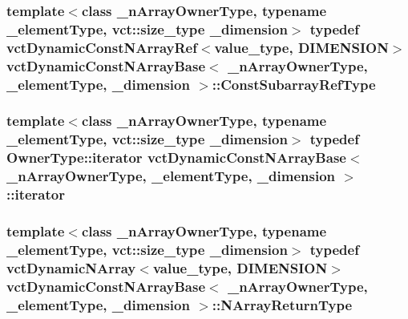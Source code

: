 \hypertarget{classvct_dynamic_const_n_array_base_a4b3508630e409eda4f0d2f55d17d89a4}{
\subsubsection[{Const\-Subarray\-Ref\-Type}]{\setlength{\rightskip}{0pt plus 5cm}template$<$class \-\_\-n\-Array\-Owner\-Type, typename \-\_\-element\-Type, vct\-::size\-\_\-type \-\_\-dimension$>$ typedef {\bf vct\-Dynamic\-Const\-N\-Array\-Ref}$<$value\-\_\-type, {\bf D\-I\-M\-E\-N\-S\-I\-O\-N}$>$ {\bf vct\-Dynamic\-Const\-N\-Array\-Base}$<$ \-\_\-n\-Array\-Owner\-Type, \-\_\-element\-Type, \-\_\-dimension $>$\-::{\bf Const\-Subarray\-Ref\-Type}}}\label{classvct_dynamic_const_n_array_base_a4b3508630e409eda4f0d2f55d17d89a4}
\hypertarget{classvct_dynamic_const_n_array_base_a0d7eee16dd05c2f5757640b3617cac5d}{
\subsubsection[{iterator}]{\setlength{\rightskip}{0pt plus 5cm}template$<$class \-\_\-n\-Array\-Owner\-Type, typename \-\_\-element\-Type, vct\-::size\-\_\-type \-\_\-dimension$>$ typedef Owner\-Type\-::iterator {\bf vct\-Dynamic\-Const\-N\-Array\-Base}$<$ \-\_\-n\-Array\-Owner\-Type, \-\_\-element\-Type, \-\_\-dimension $>$\-::{\bf iterator}}}\label{classvct_dynamic_const_n_array_base_a0d7eee16dd05c2f5757640b3617cac5d}
\hypertarget{classvct_dynamic_const_n_array_base_a7507402a90022d7a14ad7038fac07041}{
\subsubsection[{N\-Array\-Return\-Type}]{\setlength{\rightskip}{0pt plus 5cm}template$<$class \-\_\-n\-Array\-Owner\-Type, typename \-\_\-element\-Type, vct\-::size\-\_\-type \-\_\-dimension$>$ typedef {\bf vct\-Dynamic\-N\-Array}$<$value\-\_\-type, {\bf D\-I\-M\-E\-N\-S\-I\-O\-N}$>$ {\bf vct\-Dynamic\-Const\-N\-Array\-Base}$<$ \-\_\-n\-Array\-Owner\-Type, \-\_\-element\-Type, \-\_\-dimension $>$\-::{\bf N\-Array\-Return\-Type}}}\label{classvct_dynamic_const_n_array_base_a7507402a90022d7a14ad7038fac07041}
